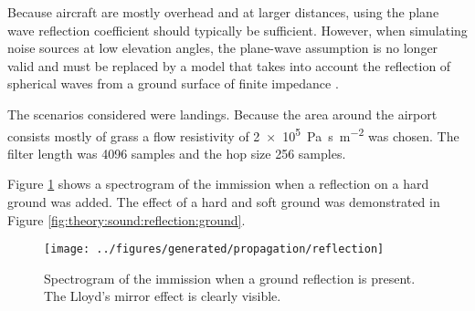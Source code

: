 Because aircraft are mostly overhead and at larger distances,
using the plane wave reflection coefficient should typically be sufficient.
However, when simulating noise sources at low elevation angles, the plane-wave
assumption is no longer valid and must be replaced by a model that takes into
account the reflection of spherical waves from a ground surface of finite
impedance \cite{Tuttle2014}. %

The scenarios considered were landings. Because the area around the airport
consists mostly of grass a flow resistivity of
\SI{2e5}{\pascal\second\per\meter\squared} was chosen. The filter length was
4096 samples and the hop size 256 samples.

Figure \ref{fig:implementation:propagation:reflection} shows a spectrogram of
the immission when a reflection on a hard ground was added.
The effect of a hard and soft ground was demonstrated in Figure \ref{fig:theory:sound:reflection:ground}.

\begin{figure}[H]
  \centering
  \texttt{[image: ../figures/generated/propagation/reflection]}
  \caption{Spectrogram of the immission when a ground reflection is present. The Lloyd's mirror effect is clearly visible.}
  \label{fig:implementation:propagation:reflection}
\end{figure} %


